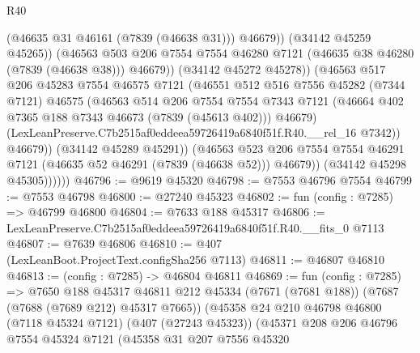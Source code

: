 \begin{lexlean}{R40}
\begin{coremodule}
                              (@46635 @31 @46161 (@7839 (@46638 @31)))
                              @46679))
                          (@34142 @45259 @45265))
                        (@46563
                          @503
                          @206
                          @7554
                          @7554
                          @46280
                          @7121
                          (@46635 @38 @46280 (@7839 (@46638 @38)))
                          @46679))
                      (@34142 @45272 @45278))
                    (@46563
                      @517
                      @206
                      @45283
                      @7554
                      @46575
                      @7121
                      (@46551
                        @512
                        @516
                        @7556
                        @45282
                        (@7344 @7121)
                        @46575
                        (@46563
                          @514
                          @206
                          @7554
                          @7554
                          @7343
                          @7121
                          (@46664 @402 @7365 @188 @7343 @46673 (@7839 (@45613 @402)))
                          @46679)
                        (LexLeanPreserve.C7b2515af0eddeea59726419a6840f51f.R40.__rel_16 @7342))
                      @46679))
                  (@34142 @45289 @45291))
                (@46563
                  @523
                  @206
                  @7554
                  @7554
                  @46291
                  @7121
                  (@46635 @52 @46291 (@7839 (@46638 @52)))
                  @46679))
              (@34142 @45298 @45305))))))
@46796 := @9619 @45320
@46798 := @7553 @46796 @7554
@46799 := @7553 @46798
@46800 := @27240 @45323
@46802 := fun (config : @7285) => @46799 @46800
@46804 := @7633 @188 @45317
@46806 := LexLeanPreserve.C7b2515af0eddeea59726419a6840f51f.R40.__fits_0 @7113
@46807 := @7639 @46806
@46810 := @407 (LexLeanBoot.ProjectText.configSha256 @7113)
@46811 := @46807 @46810
@46813 := (config : @7285) -> @46804 @46811
@46869 := fun (config : @7285) =>
  @7650
    @188
    @45317
    @46811
    @212
    @45334
    (@7671 (@7681 @188))
    (@7687 (@7688 (@7689 @212) @45317 @7665))
    (@45358
      @24
      @210
      @46798
      @46800
      (@7118 @45324 @7121)
      (@407 (@27243 @45323))
      (@45371
        @208
        @206
        @46796
        @7554
        @45324
        @7121
        (@45358
          @31
          @207
          @7556
          @45320

\end{coremodule}
\end{lexlean}
